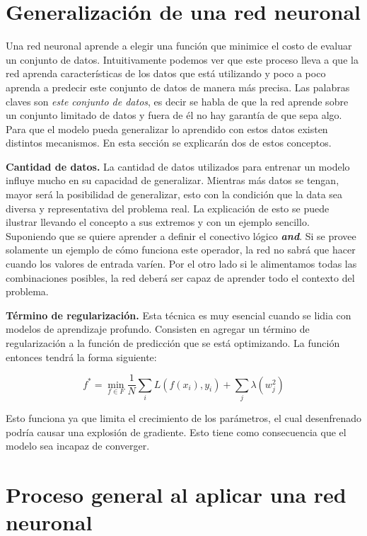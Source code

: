 \section{Generalización de una red neuronal}

Una red neuronal aprende a elegir una función que minimice el costo de evaluar un conjunto de datos. Intuitivamente podemos ver que este proceso lleva a que la red aprenda características de los datos que está utilizando y poco a poco aprenda a predecir este conjunto de datos de manera más precisa. Las palabras claves son \textit{este conjunto de datos}, es decir se habla de que la red aprende sobre un conjunto limitado de datos y fuera de él no hay garantía de que sepa algo. Para que el modelo pueda generalizar lo aprendido con estos datos existen distintos mecanismos. En esta sección se explicarán dos de estos conceptos.

\textbf{Cantidad de datos.} La cantidad de datos utilizados para entrenar un modelo influye mucho en su capacidad de generalizar. Mientras más datos se tengan, mayor será la posibilidad de generalizar, esto con la condición que la data sea diversa y representativa del problema real. La explicación de esto se puede ilustrar llevando el concepto a sus extremos y con un ejemplo sencillo. Suponiendo que se quiere aprender a definir el conectivo lógico \textbf{\textit{and}}. Si se provee solamente un ejemplo de cómo funciona este operador, la red no sabrá que hacer cuando los valores de entrada varíen. Por el otro lado si le alimentamos todas las combinaciones posibles, la red deberá ser capaz de aprender todo el contexto del problema.

\textbf{Término de regularización.} Esta técnica es muy esencial cuando se lidia con modelos de aprendizaje profundo. Consisten en agregar un término de regularización a la función de predicción que se está optimizando. La función entonces tendrá la forma siguiente: %

$$f^* = \min_{f \in F} \frac{1}{N} \sum_{i} L(f(x_i), y_i) + \sum_{j} \lambda(w_j^2)$$

Esto funciona ya que limita el crecimiento de los parámetros, el cual desenfrenado podría causar una explosión de gradiente. Esto tiene como consecuencia que el modelo sea incapaz de converger.

\section{Proceso general al aplicar una red neuronal}

